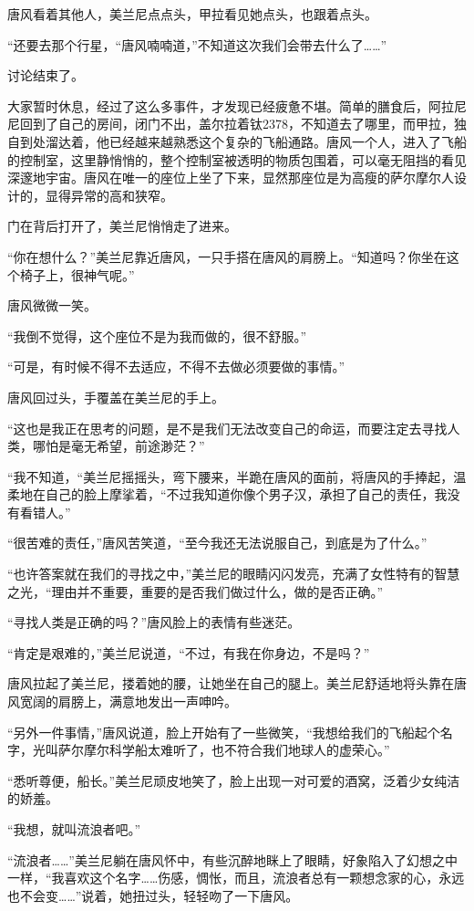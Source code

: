 唐风看着其他人，美兰尼点点头，甲拉看见她点头，也跟着点头。 

“还要去那个行星，“唐风喃喃道，”不知道这次我们会带去什么了……” 

讨论结束了。 

大家暂时休息，经过了这么多事件，才发现已经疲惫不堪。简单的膳食后，阿拉尼尼回到了自己的房间，闭门不出，盖尔拉着钛2378，不知道去了哪里，而甲拉，独自到处溜达着，他已经越来越熟悉这个复杂的飞船通路。唐风一个人，进入了飞船的控制室，这里静悄悄的，整个控制室被透明的物质包围着，可以毫无阻挡的看见深邃地宇宙。唐风在唯一的座位上坐了下来，显然那座位是为高瘦的萨尔摩尔人设计的，显得异常的高和狭窄。 

门在背后打开了，美兰尼悄悄走了进来。 

“你在想什么？”美兰尼靠近唐风，一只手搭在唐风的肩膀上。“知道吗？你坐在这个椅子上，很神气呢。” 

唐风微微一笑。 

“我倒不觉得，这个座位不是为我而做的，很不舒服。” 

“可是，有时候不得不去适应，不得不去做必须要做的事情。” 

唐风回过头，手覆盖在美兰尼的手上。 

“这也是我正在思考的问题，是不是我们无法改变自己的命运，而要注定去寻找人类，哪怕是毫无希望，前途渺茫？” 

“我不知道，“美兰尼摇摇头，弯下腰来，半跪在唐风的面前，将唐风的手捧起，温柔地在自己的脸上摩挲着，“不过我知道你像个男子汉，承担了自己的责任，我没有看错人。” 

“很苦难的责任，”唐风苦笑道，“至今我还无法说服自己，到底是为了什么。” 

“也许答案就在我们的寻找之中，”美兰尼的眼睛闪闪发亮，充满了女性特有的智慧之光，“理由并不重要，重要的是否我们做过什么，做的是否正确。” 

“寻找人类是正确的吗？”唐风脸上的表情有些迷茫。 

“肯定是艰难的，”美兰尼说道，“不过，有我在你身边，不是吗？” 

唐风拉起了美兰尼，搂着她的腰，让她坐在自己的腿上。美兰尼舒适地将头靠在唐风宽阔的肩膀上，满意地发出一声呻吟。 

“另外一件事情，”唐风说道，脸上开始有了一些微笑，“我想给我们的飞船起个名字，光叫萨尔摩尔科学船太难听了，也不符合我们地球人的虚荣心。” 

“悉听尊便，船长。”美兰尼顽皮地笑了，脸上出现一对可爱的酒窝，泛着少女纯洁的娇羞。 

“我想，就叫流浪者吧。” 

“流浪者……”美兰尼躺在唐风怀中，有些沉醉地眯上了眼睛，好象陷入了幻想之中一样，“我喜欢这个名字……伤感，惆怅，而且，流浪者总有一颗想念家的心，永远也不会变……”说着，她扭过头，轻轻吻了一下唐风。 

